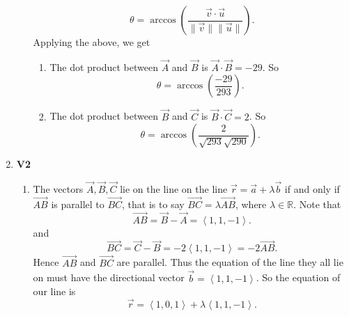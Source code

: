 \documentclass[12pt,oneside]{book}
\begin{document}
\begin{enumerate}
\begin{enumerate}
\[                \theta = \arccos \left( \frac{\vec{v} \cdot \vec{u}}{\| \vec{v} \| \| \vec{u} \|} \right)
            .\]  Applying the above, we get \begin{enumerate}
                \item The dot product between $\vec{A}$ and $\vec{B}$ is $\vec{A} \cdot \vec{B} = -29$. So \[
                    \theta = \arccos \left( \frac{-29}{293} \right)
                .\] 
                \item The dot product between $\vec{B}$ and $\vec{C}$ is $\vec{B} \cdot \vec{C} = 2$. So \[
                    \theta = \arccos \left( \frac{2}{\sqrt{293} \sqrt{290} } \right)
                .\] 
            \end{enumerate}
        \end{enumerate}
        \item \textbf{V2} \begin{enumerate}
            \item The vectors $\vec{A}, \vec{B}, \vec{C}$ lie on the line on the line $\vec{r} = \vec{a} + \lambda \vec{b}$ if and only if $\overrightarrow{AB}$ is parallel to $\overrightarrow{BC}$, that is to say $\overrightarrow{BC} = \lambda \overrightarrow{AB}$, where $\lambda \in \mathbb{R}$. Note that \[
                \overrightarrow{AB} = \vec{B} - \vec{A} = \left\langle 1, 1, -1 \right\rangle 
            .\] and \[
                \overrightarrow{BC} = \vec{C} - \vec{B} = -2\left\langle 1,1, -1 \right\rangle = -2 \overrightarrow{AB}
            .\] 
            Hence $\overrightarrow{AB}$ and $\overrightarrow{BC}$ are parallel. Thus the equation of the line they all lie on must have the directional vector $\vec{b} = \left\langle 1,1,-1 \right\rangle$. So the equation of our line is \[
                \vec{r} = \left\langle 1, 0, 1 \right\rangle + \lambda \left\langle 1,1,-1 \right\rangle
            .\] 
        \end{enumerate}
        

\end{enumerate}
\end{document}
